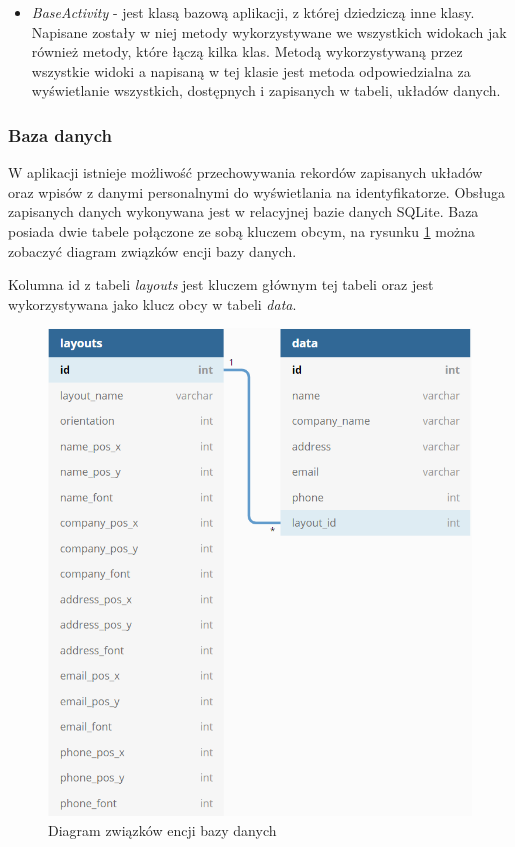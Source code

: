\documentclass[a4paper,12pt, twoside]{article}
\begin{document}
\begin{itemize}
	    \item \textit{BaseActivity} - jest klasą bazową aplikacji, z której dziedziczą inne klasy. Napisane zostały w niej metody wykorzystywane we wszystkich widokach jak również metody, które łączą kilka klas. Metodą wykorzystywaną przez wszystkie widoki a napisaną w tej klasie jest metoda odpowiedzialna za wyświetlanie wszystkich, dostępnych i zapisanych w tabeli, układów danych.
	\end{itemize}

    \subsubsection{Baza danych}
    W aplikacji istnieje możliwość przechowywania rekordów zapisanych układów oraz wpisów z danymi personalnymi do wyświetlania na identyfikatorze. Obsługa zapisanych danych wykonywana jest w relacyjnej bazie danych SQLite. Baza posiada dwie tabele połączone ze sobą kluczem obcym, na rysunku \ref{fig:database} można zobaczyć diagram związków encji bazy danych. 
    
    Kolumna id z tabeli \textit{layouts} jest kluczem głównym tej tabeli oraz jest wykorzystywana jako klucz obcy w tabeli \textit{data}. 
    
    \begin{figure}[H]
	        \centering
	        \vspace{.5cm}
			\includegraphics[width=12cm]{images/rys_11baza.png}
			\vspace{.5cm}
			\caption{Diagram związków encji bazy danych}
            \label{fig:database}
	\end{figure}
	
\end{document}
